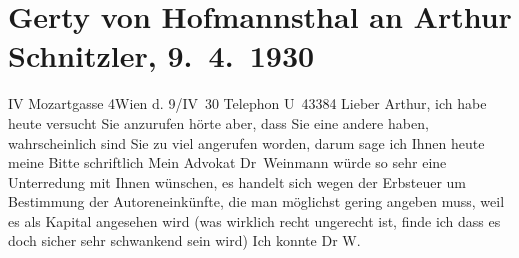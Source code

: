 

         
         \renewcommand{\erwaehntePersonen}{Personen: Gertrude von Hofmannsthal, Raimund von Hofmannsthal, Hugo August von Hofmannsthal, Anna von Hofmannsthal, Hugo von Hofmannsthal, Franz Schalk, Olga Schnitzler, Heinrich Schnitzler, Leonhard Weinmann}
         \renewcommand{\erwaehnteOrte}{Orte: Berlin, Stallburggasse, Wien}
         \renewcommand{\erwaehnteWerke}{}
               \section[Gerty von Hofmannsthal an Arthur Schnitzler, 9. 4. 1930]{ Gerty von Hofmannsthal an Arthur Schnitzler, 9. 4. 1930}\nopagebreak{}\rehead{ }\begin{ledgroupsized}[t]{13cm}\normalsize\beginnumbering \toendnotes[C]{\smallbreak\pagebreak[2]} 
\toendnotes[C]{\smallbreak}\pstart
           \noindent{}{\pb}IV Mozartgasse 4\hfill Wien d. 9/IV 30\pend
           \pstart
           Telephon U 43384\pend
           \pstart
           Lieber Arthur, ich habe heute versucht Sie anzurufen hörte aber,
               dass Sie eine andere \label{K_L02535-1v}\label{K_L02535-1h} haben, wahrscheinlich sind Sie zu viel angerufen worden, darum sage ich Ihnen
               heute meine Bitte schriftlich\pend
           \pstart
           Mein Advokat Dr Weinmann würde so sehr eine
               Unterredung mit Ihnen wünschen, es handelt sich wegen der Erbsteuer um Bestimmung der
               Autoreneinkünfte, die man möglichst gering angeben muss, weil es als Kapital
               angesehen wird (was wirklich recht ungerecht ist, finde ich dass es doch sicher sehr
               schwankend sein wird) Ich konnte Dr W.

\end{ledgroupsized}
